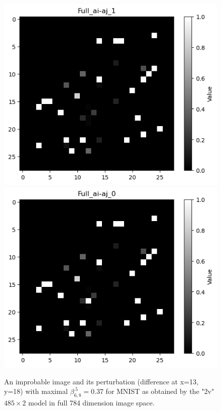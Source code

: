 \begin{figure}[t!]
	\centering
\includegraphics[scale=0.5]{image.png} \hspace{0.8cm}
\includegraphics[scale=0.5]{perturb.png}
\caption{An improbable image and its perturbation (difference at x=13, y=18) 
with maximal $\beta^{.5}_{6,8}=0.37$ for MNIST as obtained by the "2v" $485 \times 2$ model in full 784 dimension image space.}
\label{fig3}
\end{figure}	


